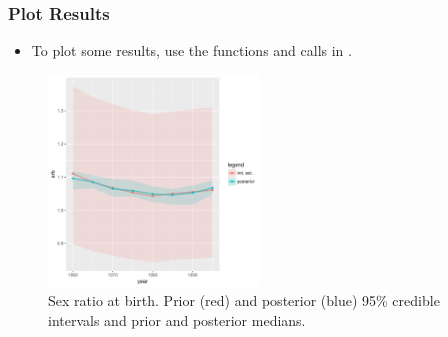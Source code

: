 \documentclass[smaller,compress,table]{beamer}
\begin{document}
\begin{frame}
  \frametitle{Plot Results }
  \begin{itemize}
    \item To plot some results, use the functions and calls in .
  \end{itemize}
  \begin{figure}
    \centering    \includegraphics[width=0.5\textwidth]{extras/Thai_srb_priorpost_q95_iussp2017_slides.pdf}
    \caption{Sex ratio at birth. Prior (red) and posterior (blue) 95\% credible intervals and prior and posterior medians.}
  \end{figure}
\end{frame}












\end{document}
